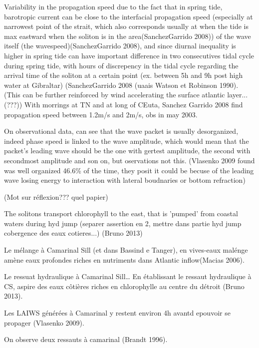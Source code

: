 Variability in the propagation speed due to the fact that in spring tide, barotropic current can be close to the interfacial propagation speed (especially at narrowest point of the strait, which also corresponds usually at when the tide is max eastward when the soliton is in the area(SanchezGarrido 2008)) of the wave itself (the wavespeed)(SanchezGarrido 2008), and since diurnal inequality is higher in spring tide can have important difference in two consecutives tidal cycle during spring tide, with hours of discrepency in the tidal cycle regarding the arrival time of the soliton at a certain point (ex. between 5h and 9h post high water at Gibraltar) (SanchezGarrido 2008  (uaais Watson et Robinson 1990). (This can be further reinforced by wind accelerating the surface atlantic layer...(???))
With morrings at TN and at long of CEuta, Sanchez Garrido 2008 find propagation speed between 1.2m/s and 2m/s, obs in may 2003.

On observational data, can see that the wave packet is usually desorganized, indeed phase speed is linked to the wave amplitude, which would mean that the packet's leading wave should be the one with gertest amplitude, the second with secondmost amplitude and son on, but oservations not this. (Vlasenko 2009 found was well organized 46.6\% of the time, they posit it could be becuse of the leading wave losing energy to interaction with lateral boudnaries or bottom refraction)


(Mot sur réflexion??? quel papier)

The solitons transport chlorophyll to the east, that is 'pumped' from coastal waters during hyd jump (separer assertion en 2, mettre dans partie hyd jump cobergence des eaux cotieres...) (Bruno 2013)




Le mélange à Camarinal Sill (et dans Bassind e Tanger), en vives-eaux malénge amène eaux profondes riches en nutriments dans Atlantic inflow(Macias 2006).

Le ressuat hydraulique à Camarinal Sill… En établissant le ressaut hydraulique à CS, aspire des eaux côtières riches en chlorophylle au centre du détroit (Bruno 2013).

Les LAIWS générées à Camarinal y restent environ 4h avantd epouvoir se propager (Vlasenko 2009).

On observe deux ressauts à camarinal (Brandt 1996).

